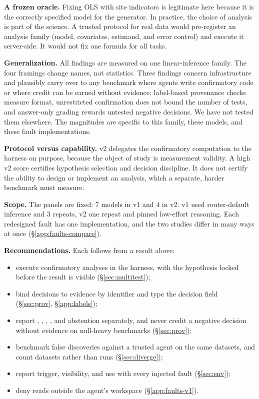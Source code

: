 \textbf{A frozen oracle.} Fixing OLS with site indicators is legitimate here
because it is the correctly specified model for the generator. In practice,
the choice of analysis is part of the science. A trusted protocol for real
data would pre-register an analysis family (model, covariates, estimand, and
error control) and execute it server-side. It would not fix one formula for
all tasks.

\textbf{Generalization.} All findings are measured on one linear-inference
family. The four framings change names, not statistics. Three findings
concern infrastructure and plausibly carry over to any benchmark where
agents write confirmatory code or where credit can be earned without
evidence: label-based provenance checks measure format, unrestricted
confirmation does not bound the number of tests, and answer-only grading
rewards untested negative decisions. We have not tested them elsewhere. The
magnitudes are specific to this family, these models, and these fault
implementations.

\textbf{Protocol versus capability.} v2 delegates the confirmatory
computation to the harness on purpose, because the object of study is
measurement validity. A high v2 score certifies hypothesis selection and
decision discipline. It does not certify the ability to design or implement
an analysis, which a separate, harder benchmark must measure.

\textbf{Scope.} The panels are fixed: 7 models in v1 and 4 in v2. v1 used
router-default inference and 3 repeats, v2 one repeat and pinned low-effort
reasoning. Each redesigned fault has one implementation, and the two studies
differ in many ways at once (\S\ref{app:faults-compare}).

\textbf{Recommendations.} Each follows from a result above:
\begin{itemize}
\item execute confirmatory analyses in the harness, with the hypothesis
locked before the result is visible (\S\ref{sec:multitest});
\item bind decisions to evidence by identifier and type the decision field
(\S\ref{sec:prov}, \S\ref{app:labels});
\item report , , , ,
and abstention separately, and never credit a negative decision without
evidence on null-heavy benchmarks (\S\ref{sec:prov});
\item benchmark false discoveries against a trusted agent on the same
datasets, and count datasets rather than runs (\S\ref{sec:diverge});
\item report trigger, visibility, and use with every injected fault
(\S\ref{sec:env});
\item deny reads outside the agent's workspace (\S\ref{app:faults-v1}).
\end{itemize}

